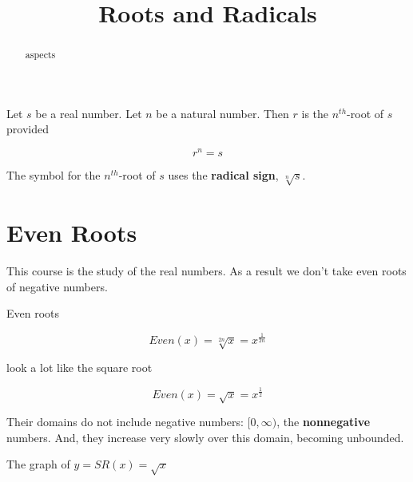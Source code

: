 \documentclass{ximera}
\title{Roots and Radicals}
\begin{document}
\begin{abstract}
aspects
\end{abstract}
\maketitle




\begin{definition}


Let $s$ be a real number. Let $n$ be a natural number.  Then $r$ is the $n^{th}$-root of $s$ provided


\[    r^n = s     \]



The symbol for the $n^{th}$-root of $s$ uses the \textbf{radical sign}, $\sqrt[n]{s}$.

\end{definition}







\section{Even Roots}

This course is the study of the real numbers. As a result we don't take even roots of negative numbers.

Even roots

\[   Even(x) = \sqrt[2n]{x} = x^{\tfrac{1}{2n}}          \]

look a lot like the square root


\[   Even(x) = \sqrt{x} = x^{\tfrac{1}{2}}          \]



Their domains do not include negative numbers: $[0, \infty)$, the \textbf{nonnegative} numbers.  And, they increase very slowly over this domain, becoming unbounded.







The graph of $y = SR(x) = \sqrt{x}$
\end{document}
